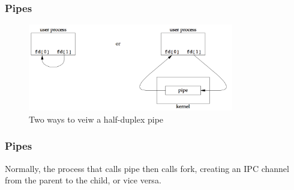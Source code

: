 \documentclass[newPxFont,sthlmFooter,nooffset]{beamer}
\begin{document}
\begin{frame}[t]
  \frametitle{Pipes}
  \begin{figure}[h]
    \centering
    \includegraphics[width=0.8\textwidth]{./figures/fig15_2-twoways.png}
    \caption{Two ways to veiw a half-duplex pipe}
  \end{figure}


\end{frame}



\begin{frame}[t]
  \frametitle{Pipes}
Normally, the process that calls pipe then calls fork, creating an IPC channel from the parent to the child, or vice versa. 
  \begin{figure}[h]
    \centering

  \end{figure}

\end{frame}
\end{document}
